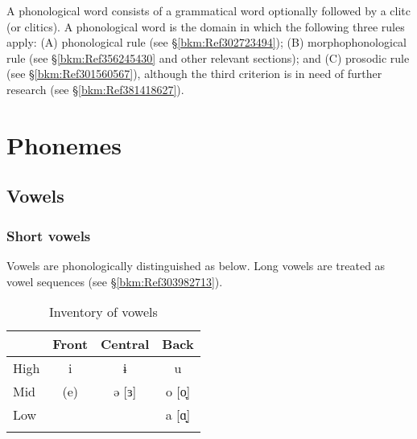 \noindent A phonological word consists of a grammatical word optionally followed by a clitc (or clitics). A phonological word is the domain in which the following three rules apply: (A) phonological rule (see §\ref{bkm:Ref302723494}); (B) morphophonological rule (see §\ref{bkm:Ref356245430} and other relevant sections); and (C) prosodic rule (see §\ref{bkm:Ref301560567}), although the third criterion is in need of further research (see §\ref{bkm:Ref381418627}).

\section{Phonemes}
\label{bkm:Ref381193872}\hypertarget{RefHeadingToc395696962}{}\label{bkm:Ref347174415}\subsection{Vowels}
\label{bkm:Ref312504424}\hypertarget{RefHeadingToc395696963}{}\subsubsection{Short vowels}
\hypertarget{RefHeadingToc395696964}{}
Vowels are phonologically distinguished as below. Long vowels are treated as vowel sequences (see §\ref{bkm:Ref303982713}).

\begin{table}
\caption{Inventory of vowels}
\begin{tabular}{lccc} 
\lsptoprule
     & Front & Central & Back\\
     \midrule
High &  i    & ɨ       & u\\
Mid  & (e)   & ə [ɜ]   & o [o̞]\\
Low  &       &         & a [ɑ̟]\\
\lspbottomrule
\end{tabular}
\end{table}

